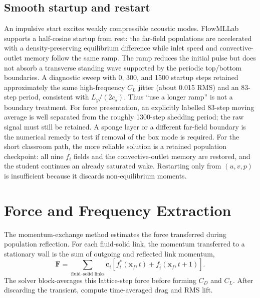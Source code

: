 \documentclass[11pt]{article}
\begin{document}
\subsection{Smooth startup and restart}
An impulsive start excites weakly compressible acoustic modes. FlowMLLab
supports a half-cosine startup from rest: the far-field populations are
accelerated with a density-preserving equilibrium difference while inlet speed
and convective-outlet memory follow the same ramp.
The ramp reduces the initial pulse but does not absorb a transverse standing
wave supported by the periodic top/bottom boundaries. A diagnostic sweep with
0, 300, and 1500 startup steps retained approximately the same high-frequency
$C_L$ jitter (about 0.015 RMS) and an 83-step period, consistent with
$L_y/(2c_s)$. Thus ``use a longer ramp'' is not a boundary treatment.
For force presentation, an explicitly labelled 83-step moving average is well
separated from the roughly 1300-step shedding period; the raw signal must still
be retained. A sponge layer or a different far-field boundary is the numerical
remedy to test if removal of the box mode is required.
For the short classroom path, the more reliable solution is a retained
population checkpoint: all nine $f_i$ fields and the convective-outlet memory
are restored, and the student continues an already saturated wake. Restarting
only from $(u,v,p)$ is insufficient because it discards non-equilibrium moments.

\section{Force and Frequency Extraction}
The momentum-exchange method estimates the force transferred during population
reflection. For each fluid-solid link, the momentum transferred to a stationary
wall is the sum of outgoing and reflected link momentum,
\begin{equation}
\bm{F}=\sum_{\text{fluid--solid links}}
\bm{c}_i\left[f_i^*(\bm{x}_f,t)+
f_{\bar i}(\bm{x}_f,t+1)\right].
\end{equation}
The solver block-averages this lattice-step force before forming $C_D$ and
$C_L$. After discarding the transient, compute time-averaged drag and RMS lift.
\end{document}

